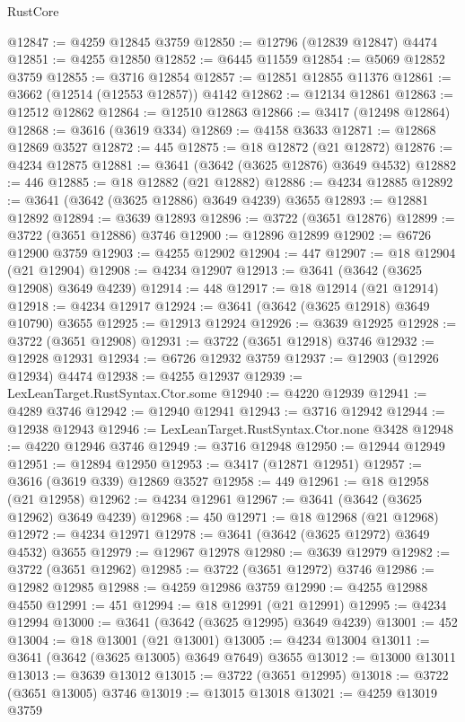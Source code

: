 \begin{lexlean}{RustCore}
\begin{coremodule}
@12847 := @4259 @12845 @3759
@12850 := @12796 (@12839 @12847) @4474
@12851 := @4255 @12850
@12852 := @6445 @11559
@12854 := @5069 @12852 @3759
@12855 := @3716 @12854
@12857 := @12851 @12855 @11376
@12861 := @3662 (@12514 (@12553 @12857)) @4142
@12862 := @12134 @12861
@12863 := @12512 @12862
@12864 := @12510 @12863
@12866 := @3417 (@12498 @12864)
@12868 := @3616 (@3619 @334)
@12869 := @4158 @3633
@12871 := @12868 @12869 @3527
@12872 := 445
@12875 := @18 @12872 (@21 @12872)
@12876 := @4234 @12875
@12881 := @3641 (@3642 (@3625 @12876) @3649 @4532)
@12882 := 446
@12885 := @18 @12882 (@21 @12882)
@12886 := @4234 @12885
@12892 := @3641 (@3642 (@3625 @12886) @3649 @4239) @3655
@12893 := @12881 @12892
@12894 := @3639 @12893
@12896 := @3722 (@3651 @12876)
@12899 := @3722 (@3651 @12886) @3746
@12900 := @12896 @12899
@12902 := @6726 @12900 @3759
@12903 := @4255 @12902
@12904 := 447
@12907 := @18 @12904 (@21 @12904)
@12908 := @4234 @12907
@12913 := @3641 (@3642 (@3625 @12908) @3649 @4239)
@12914 := 448
@12917 := @18 @12914 (@21 @12914)
@12918 := @4234 @12917
@12924 := @3641 (@3642 (@3625 @12918) @3649 @10790) @3655
@12925 := @12913 @12924
@12926 := @3639 @12925
@12928 := @3722 (@3651 @12908)
@12931 := @3722 (@3651 @12918) @3746
@12932 := @12928 @12931
@12934 := @6726 @12932 @3759
@12937 := @12903 (@12926 @12934) @4474
@12938 := @4255 @12937
@12939 := LexLeanTarget.RustSyntax.Ctor.some
@12940 := @4220 @12939
@12941 := @4289 @3746
@12942 := @12940 @12941
@12943 := @3716 @12942
@12944 := @12938 @12943
@12946 := LexLeanTarget.RustSyntax.Ctor.none @3428
@12948 := @4220 @12946 @3746
@12949 := @3716 @12948
@12950 := @12944 @12949
@12951 := @12894 @12950
@12953 := @3417 (@12871 @12951)
@12957 := @3616 (@3619 @339) @12869 @3527
@12958 := 449
@12961 := @18 @12958 (@21 @12958)
@12962 := @4234 @12961
@12967 := @3641 (@3642 (@3625 @12962) @3649 @4239)
@12968 := 450
@12971 := @18 @12968 (@21 @12968)
@12972 := @4234 @12971
@12978 := @3641 (@3642 (@3625 @12972) @3649 @4532) @3655
@12979 := @12967 @12978
@12980 := @3639 @12979
@12982 := @3722 (@3651 @12962)
@12985 := @3722 (@3651 @12972) @3746
@12986 := @12982 @12985
@12988 := @4259 @12986 @3759
@12990 := @4255 @12988 @4550
@12991 := 451
@12994 := @18 @12991 (@21 @12991)
@12995 := @4234 @12994
@13000 := @3641 (@3642 (@3625 @12995) @3649 @4239)
@13001 := 452
@13004 := @18 @13001 (@21 @13001)
@13005 := @4234 @13004
@13011 := @3641 (@3642 (@3625 @13005) @3649 @7649) @3655
@13012 := @13000 @13011
@13013 := @3639 @13012
@13015 := @3722 (@3651 @12995)
@13018 := @3722 (@3651 @13005) @3746
@13019 := @13015 @13018
@13021 := @4259 @13019 @3759

\end{coremodule}
\end{lexlean}
